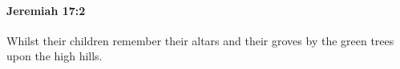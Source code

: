 
		\paragraph{Jeremiah 17:2} %
			\label{JEREMIAH-17-2}

			Whilst their children remember their altars and their groves by the green trees upon the high hills.


